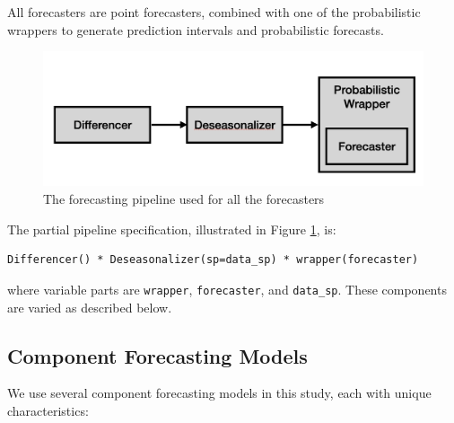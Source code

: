 All forecasters are point forecasters, combined with one of the probabilistic wrappers to generate prediction intervals and probabilistic forecasts.

\begin{figure}
    \centering
    \includegraphics[width=\textwidth]{Figures/Pipeline.png}
    \caption{The forecasting pipeline used for all the forecasters}
    \label{fig:pipeline}
\end{figure}

The partial pipeline specification, illustrated in Figure \ref{fig:pipeline}, is:

\begin{verbatim}
Differencer() * Deseasonalizer(sp=data_sp) * wrapper(forecaster)
\end{verbatim}

where variable parts are \texttt{wrapper}, \texttt{forecaster}, and \texttt{data\_sp}. These components are varied as described below.

\subsection{Component Forecasting Models}

We use several component forecasting models in this study, each with unique characteristics:

